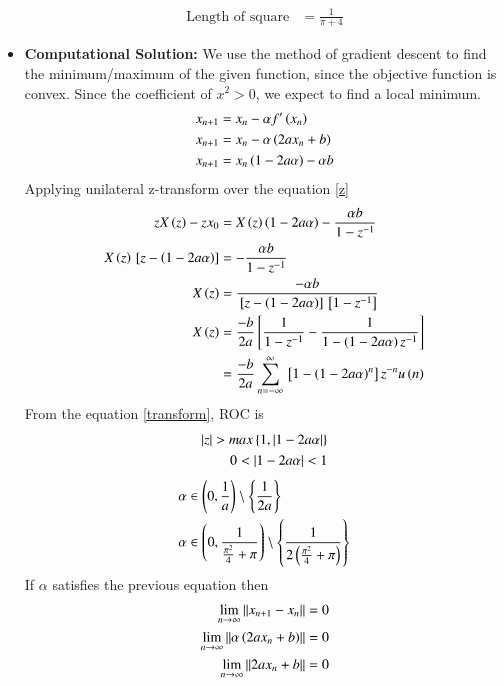 \documentclass[journal]{IEEEtran}
\numberwithin{equation}{enumi}
\numberwithin{figure}{enumi}
\begin{document}
\begin{itemize}
\begin{align}
        \text{Length of square} &= \frac{1}{\pi + 4}
    \end{align}
    \item \textbf{Computational Solution:}
    We use the method of gradient descent to find the minimum/maximum of the given function, since the objective function is convex. Since the coefficient of $x^2 > 0$, we expect to find a local minimum.
    \begin{align}
        x_{n + 1} &= x_n - \alpha f^{\prime}\left(x_n\right)\\
        x_{n + 1} &= x_n - \alpha \left(2ax_n + b\right)\\
        x_{n + 1} &= x_n \left(1 - 2a\alpha\right) - \alpha b \label{z}
    \end{align}
    Applying unilateral z-transform over the equation \eqref{z}
    \begin{align}
        zX\left(z\right) - zx_0 &= X\left(z\right)\left(1 - 2a\alpha\right) - \frac{\alpha b}{1 - z^{-1}}\\
        X\left(z\right){}\left[z - \left(1 - 2a\alpha\right)\right] &= - \frac{\alpha b}{1 - z^{-1}} \\
        X\left(z\right) &= \frac{-\alpha b}{{}\left[z - \left(1 - 2a\alpha\right)\right] {}\left[1 - z^{-1}\right]}\\
        X\left(z\right) &= \frac{-b}{2a} {}\left[\frac{1}{1 - z^{-1}} - \frac{1}{1 - \left(1 - 2a\alpha\right)z^{-1}}\right]\\
        &= \frac{-b}{2a}\sum_{n = -\infty}^{\infty} {{}\left[1 - \left(1 - 2a\alpha\right)^n\right]z^{-n}}u\left(n\right) \label{transform}
    \end{align}
    From the equation \eqref{transform}, ROC is 
    \begin{align}
        \left\vert z\right\vert > max\left\{1, \left\vert1 - 2a\alpha\right\vert\right\}\\
        0 < \left\vert1 - 2a\alpha\right\vert < 1
    \end{align}
    \begin{align}
        \alpha &\in \left(0, \frac{1}{a}\right)\setminus \left\{\frac{1}{2a}\right\}\\
        \alpha &\in \left(0, \frac{1}{\frac{\pi^2}{4} + \pi}\right) \setminus \left\{\frac{1}{2\left(\frac{\pi^2}{4} + \pi\right)}\right\}
    \end{align}
    If $\alpha$ satisfies the previous equation then 
    \begin{align}
        \lim_{n \to \infty}{\norm{x_{n+1} - x_n}} &= 0\\
        \lim_{n \to \infty}{\norm{\alpha\brak{2ax_n + b}}} &= 0\\
        \lim_{n \to \infty}{\norm{2ax_n + b}} &= 0\\

\end{align}
\end{itemize}
\end{document}
